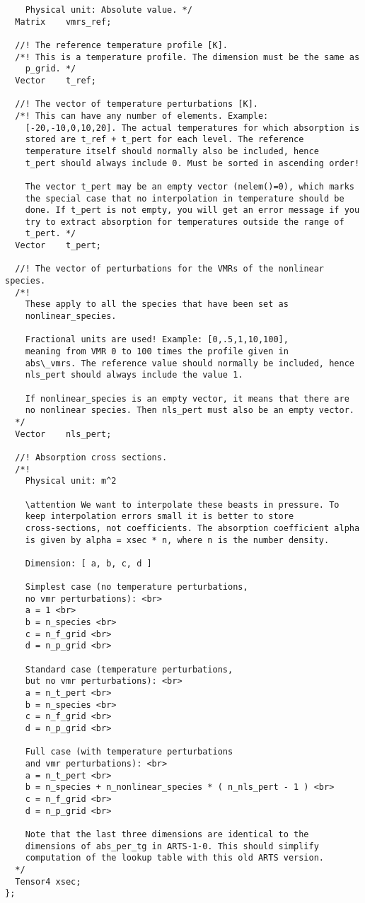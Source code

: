 \begin{lstlisting}
    Physical unit: Absolute value. */
  Matrix    vmrs_ref;

  //! The reference temperature profile [K].
  /*! This is a temperature profile. The dimension must be the same as
    p_grid. */
  Vector    t_ref;

  //! The vector of temperature perturbations [K].
  /*! This can have any number of elements. Example:
    [-20,-10,0,10,20]. The actual temperatures for which absorption is
    stored are t_ref + t_pert for each level. The reference
    temperature itself should normally also be included, hence 
    t_pert should always include 0. Must be sorted in ascending order!

    The vector t_pert may be an empty vector (nelem()=0), which marks
    the special case that no interpolation in temperature should be
    done. If t_pert is not empty, you will get an error message if you
    try to extract absorption for temperatures outside the range of
    t_pert. */
  Vector    t_pert;

  //! The vector of perturbations for the VMRs of the nonlinear species.
  /*!
    These apply to all the species that have been set as
    nonlinear_species.

    Fractional units are used! Example: [0,.5,1,10,100],
    meaning from VMR 0 to 100 times the profile given in
    abs\_vmrs. The reference value should normally be included, hence
    nls_pert should always include the value 1.

    If nonlinear_species is an empty vector, it means that there are
    no nonlinear species. Then nls_pert must also be an empty vector.
  */
  Vector    nls_pert;

  //! Absorption cross sections.
  /*!
    Physical unit: m^2

    \attention We want to interpolate these beasts in pressure. To
    keep interpolation errors small it is better to store
    cross-sections, not coefficients. The absorption coefficient alpha
    is given by alpha = xsec * n, where n is the number density.

    Dimension: [ a, b, c, d ]

    Simplest case (no temperature perturbations, 
    no vmr perturbations): <br>
    a = 1 <br>
    b = n_species <br>
    c = n_f_grid <br>
    d = n_p_grid <br>

    Standard case (temperature perturbations, 
    but no vmr perturbations): <br>
    a = n_t_pert <br>
    b = n_species <br>
    c = n_f_grid <br>
    d = n_p_grid <br>

    Full case (with temperature perturbations 
    and vmr perturbations): <br>
    a = n_t_pert <br>
    b = n_species + n_nonlinear_species * ( n_nls_pert - 1 ) <br>
    c = n_f_grid <br>
    d = n_p_grid <br>

    Note that the last three dimensions are identical to the
    dimensions of abs_per_tg in ARTS-1-0. This should simplify
    computation of the lookup table with this old ARTS version.
  */
  Tensor4 xsec;
};
\end{lstlisting}

